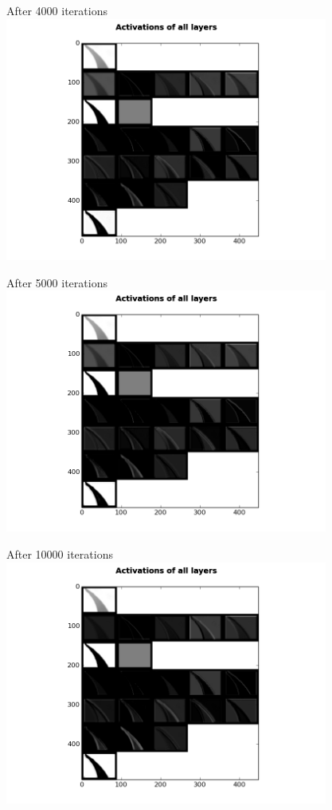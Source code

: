 \begin{frame}{After 4000 iterations}
\includegraphics[height=8.0cm]{data/activations/output-4000.png}\\ 
\end{frame}

\begin{frame}{After 5000 iterations}
\includegraphics[height=8.0cm]{data/activations/output-5000.png}\\ 
\end{frame}

\begin{frame}{After 10000 iterations}
\includegraphics[height=8.0cm]{data/activations/output-10000.png}\\ 
\end{frame}

